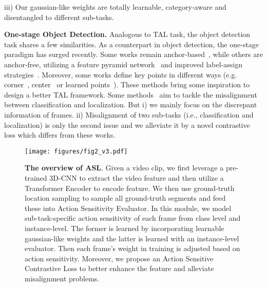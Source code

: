 \documentclass[10pt,twocolumn,letterpaper]{article}
\begin{document}
iii) Our gaussian-like weights are totally learnable, category-aware and disentangled to different sub-tasks.
\par \textbf{One-stage Object Detection.} Analogous to TAL task, the object detection task shares a few similarities. As a counterpart in object detection, the one-stage paradigm has surged recently. Some works remain anchor-based~\cite{lin2017focal}, while others are anchor-free, utilizing a feature pyramid network~\cite{fpn,tian2019fcos} and improved label-assign strategies~\cite{atss,zhu2020autoassign,zhu2019feature,ohem}. Moreover, some works define key points in different ways (e.g. corner~\cite{law2018cornernet}, center~\cite{duan2019centernet,tian2019fcos} or learned points~\cite{yang2019reppoints}). These methods bring some inspiration to design a better TAL framework. Some methods~\cite{feng2021tood,li2020generalizedfocal1,li2021generalizedfocal2} aim to tackle the misalignment between classification and localization. But i) we mainly focus on the discrepant information of frames. ii) Misalignment of two sub-tasks (i.e., classification and localization) is only the second issue and we alleviate it by a novel contrastive loss which differs from these works.

\begin{figure*}[htbp]
\centering
\texttt{[image: figures/fig2\_v3.pdf]}
\caption{\textbf{The overview of ASL}. Given a video clip, we first leverage a pre-trained 3D-CNN to extract the video feature and then utilize a Transformer Encoder to encode feature. We then use ground-truth location sampling to sample all ground-truth segments and feed these into Action Sensitivity Evaluator. In this module, we model sub-task-specific action sensitivity of each frame from class level and instance-level. The former is learned by incorporating learnable gaussian-like weights and the latter is learned with an instance-level evaluator. Then each frame's weight in training is adjusted based on action sensitivity. Moreover, we propose an Action Sensitive Contrastive Loss to better enhance the feature and alleviate misalignment problems.}
\label{fig:main}
\vspace{-0.75em}
\end{figure*}
\end{document}
